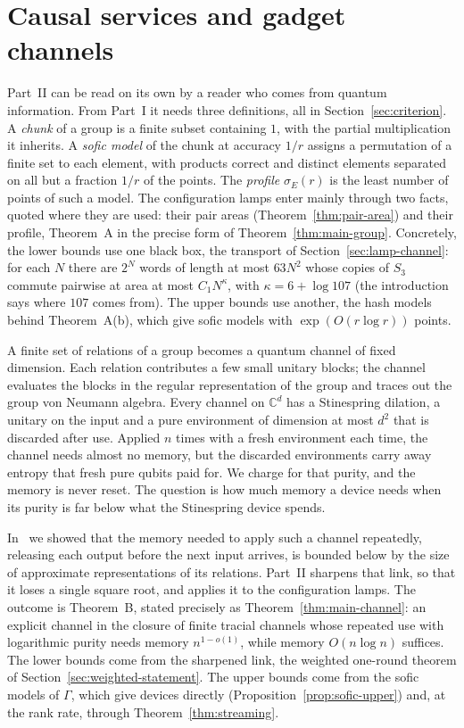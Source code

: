 \section{Causal services and gadget channels}\label{sec:channel}\label{sec:channel-setting}

Part~II can be read on its own by a reader who comes from quantum information. From Part~I it needs three definitions, all in
Section~\ref{sec:criterion}. A \emph{chunk} of a group is a finite subset containing $1$, with the partial multiplication it inherits. A
\emph{sofic model} of the chunk at accuracy $1/r$ assigns a permutation of a finite set to each element, with products correct and distinct
elements separated on all but a fraction $1/r$ of the points. The \emph{profile} $\sigma_E(r)$ is the least number of points of such a model.
The configuration lamps enter mainly through two facts, quoted where they are used: their pair areas (Theorem~\ref{thm:pair-area}) and their
profile, Theorem~A in the precise form of Theorem~\ref{thm:main-group}. Concretely, the lower bounds use one black box, the transport of
Section~\ref{sec:lamp-channel}: for each $N$ there are $2^N$ words of length at most $63N^2$ whose copies of $S_3$ commute pairwise at area at
most $C_1N^\kappa$, with $\kappa=6+\log107$ (the introduction says where $107$ comes from). The upper bounds use another, the hash models
behind Theorem~A(b), which give sofic models with $\exp(O(r\log r))$ points.

A finite set of relations of a group becomes a quantum channel of fixed dimension. Each relation contributes a few small unitary blocks; the
channel evaluates the blocks in the regular representation of the group and traces out the group von Neumann algebra. Every channel on
$\mathbb C^d$ has a Stinespring dilation, a unitary on the input and a pure environment of dimension at most $d^2$ that is discarded after
use. Applied $n$ times with a fresh environment each time, the channel needs almost no memory, but the discarded environments carry away
entropy that fresh pure qubits paid for. We charge for that purity, and the memory is never reset. The question is how much memory a device
needs when its purity is far below what the Stinespring device spends.

In~\cite{DouglasMghirbiB} we showed that the memory needed to apply such a channel repeatedly, releasing each output before the next input
arrives, is bounded below by the size of approximate representations of its relations. Part~II sharpens that link, so that it loses a single
square root, and applies it to the configuration lamps. The outcome is Theorem~B, stated precisely as Theorem~\ref{thm:main-channel}: an
explicit channel in the closure of finite tracial channels whose repeated use with logarithmic purity needs memory $n^{1-o(1)}$, while memory
$O(n\log n)$ suffices. The lower bounds come from the sharpened link, the weighted one-round theorem of Section~\ref{sec:weighted-statement}.
The upper bounds come from the sofic models of $\Gamma$, which give devices directly (Proposition~\ref{prop:sofic-upper}) and, at the rank
rate, through Theorem~\ref{thm:streaming}.

